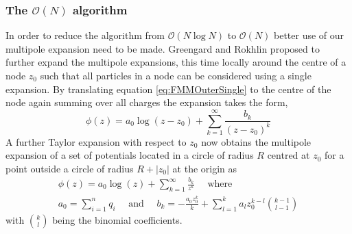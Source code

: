 \subsubsection{\texorpdfstring{The $\mathcal{O}(N)$ algorithm}{The O(N) algorithm}} \label{subsec:OrderNFMM}
In order to reduce the algorithm from $\mathcal{O}(N\log N)$ to $\mathcal{O}(N)$ better use of our multipole expansion need to be made. Greengard and Rokhlin proposed to further expand the multipole expansions, this time locally around the centre of a node $z_0$ such that all particles in a node can be considered using a single expansion.
By translating equation \cref{eq:FMMOuterSingle} to the centre of the node again summing over all charges the expansion takes the form,
\begin{equation}
\label{eq:FMMOuterMultiTrans1}
    \phi(z) = a_0\log(z-z_0) + \sum_{k=1}^\infty \frac{b_k}{(z-z_0)^k}
\end{equation}
A further Taylor expansion with respect to $z_0$ now obtains the multipole expansion of a set of potentials located in a circle of radius $R$ centred at $z_0$ for a point outside a circle of radius $R+|z_0|$ at the origin as
\begin{equation}
\label{eq:FMMOuterMultiTrans2}
\begin{gathered}
    \phi(z) = a_0\log(z) + \sum_{k=1}^\infty \frac{b_k}{z^k} \quad \text{ where } \\
    a_0 = \sum_{i=1}^n q_i \quad \text{ and } \quad b_k = -\frac{a_0 z_0^k}{k} + \sum_{l=1}^{k} a_l z_0^{k-l} \binom{k-1}{l-1}
\end{gathered}
\end{equation}
with $\binom{k}{l}$ being the binomial coefficients.

